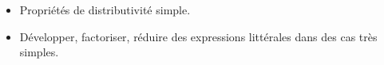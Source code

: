 \begin{prerequis}    
    \begin{itemize}
        \item[\emoji{red-heart}] Propriétés de distributivité simple.
        \columnbreak
        \item[\emoji{diamond-suit}] Développer, factoriser, réduire des expressions littérales dans des cas très simples.
    \end{itemize}
\end{prerequis}